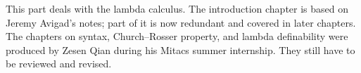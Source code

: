 \documentclass[../../include/open-logic-part]{subfiles}
\begin{document}

\begin{editorial}
This part deals with the lambda calculus. The introduction chapter is
based on Jeremy Avigad's notes; part of it is now redundant and covered in
later chapters. The chapters on syntax, Church--Rosser property, and
lambda definability were produced by Zesen Qian during his Mitacs summer
internship. They still have to be reviewed and revised.
\end{editorial}





\OLEndPartHook
\end{document}
